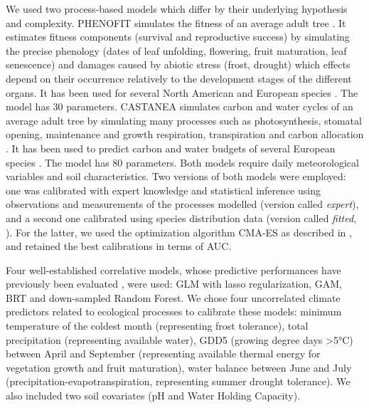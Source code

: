 \documentclass[pdflatex, sn-nature]{sn-jnl}%
\newcommand{\textappr}{\raisebox{0.5ex}{\texttildelow}} %
\begin{document}
We used two process-based models which differ by their underlying hypothesis and complexity. 
PHENOFIT simulates the fitness of an average adult tree \cite{Chuine2001}. It estimates fitness components (survival and reproductive success) by simulating the precise phenology (dates of leaf unfolding, flowering, fruit maturation, leaf senescence) and damages caused by abiotic stress (frost, drought) which effects depend on their occurrence relatively to the development stages of the different organs. It has been used for several North American and European species \cite{Morin2007, Saltre2013, Duputie2015, Gauzere2020}. The model has \textappr30 parameters. 
CASTANEA simulates carbon and water cycles of an average adult tree by simulating many processes such as photosynthesis, stomatal opening, maintenance and growth respiration, transpiration and carbon allocation  \cite{Dufrene2005}. It has been used to predict carbon and water budgets of several European species \cite{Davi2006, Delpierre2012, Davi2017}. 
The model has \textappr80 parameters. 
Both models require daily meteorological variables and soil characteristics. 
Two versions of both models were employed: one was calibrated with expert knowledge and statistical inference using observations and measurements of the processes modelled (version called \emph{expert}), and a second one calibrated using species distribution data (version called \emph{fitted}, \cite{VanderMeersch2023}). For the latter, we used the optimization algorithm CMA-ES \cite{Hansen2001} as described in \cite{VanderMeersch2023}, and retained the best calibrations in terms of AUC.
  
Four well-established correlative models, whose predictive performances have previously been evaluated \cite{Valavi2022}, were used: GLM with lasso regularization, GAM, BRT and down-sampled Random Forest. We chose four uncorrelated climate predictors related to ecological processes to calibrate these models: minimum temperature of the coldest month (representing frost tolerance), total precipitation (representing available water), GDD5 (growing degree days  \textgreater5°C) between April and September (representing available thermal energy for vegetation growth and fruit maturation), water balance between June and July (precipitation-evapotranspiration, representing summer drought tolerance). We also included two soil covariates (pH and Water Holding Capacity).
  
\end{document}
